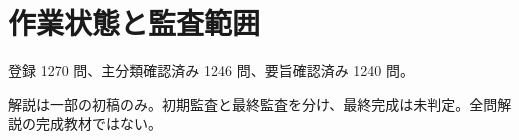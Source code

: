 \chapter{作業状態と監査範囲}
登録 1270 問、主分類確認済み 1246 問、要旨確認済み 1240 問。
\par 解説は一部の初稿のみ。初期監査と最終監査を分け、最終完成は未判定。全問解説の完成教材ではない。
